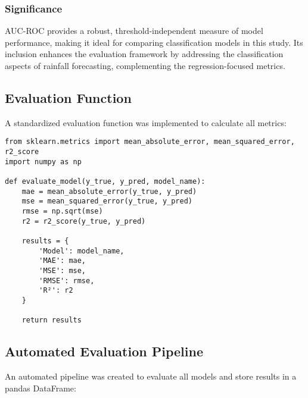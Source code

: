 \documentclass[12pt]{article}
\begin{document}
\subsubsection{Significance}
AUC-ROC provides a robust, threshold-independent measure of model performance, making it ideal for comparing classification models in this study. Its inclusion enhances the evaluation framework by addressing the classification aspects of rainfall forecasting, complementing the regression-focused metrics.

\subsection{Evaluation Function}
\label{subsec:evaluation_function}

A standardized evaluation function was implemented to calculate all metrics:

\begin{verbatim}
from sklearn.metrics import mean_absolute_error, mean_squared_error, r2_score
import numpy as np

def evaluate_model(y_true, y_pred, model_name):
    mae = mean_absolute_error(y_true, y_pred)
    mse = mean_squared_error(y_true, y_pred)
    rmse = np.sqrt(mse)
    r2 = r2_score(y_true, y_pred)
    
    results = {
        'Model': model_name,
        'MAE': mae,
        'MSE': mse,
        'RMSE': rmse,
        'R²': r2
    }
    
    return results
\end{verbatim}

\subsection{Automated Evaluation Pipeline}
\label{subsec:evaluation_pipeline}

An automated pipeline was created to evaluate all models and store results in a pandas DataFrame:
\end{document}
